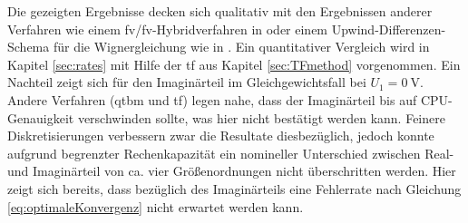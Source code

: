 Die gezeigten Ergebnisse decken sich qualitativ mit den Ergebnissen anderer Verfahren wie einem \ac{fv}/\ac{fv}-Hybridverfahren in \cite{lukas1} oder einem Upwind-Differenzen-Schema für die Wignergleichung wie in \cite{frensley2}. Ein quantitativer Vergleich wird in Kapitel \ref{sec:rates} mit Hilfe der \ac{tf} aus Kapitel \ref{sec:TFmethod} vorgenommen. Ein Nachteil zeigt sich für den Imaginärteil im Gleichgewichtsfall bei $U_1=\SI{0}{\volt}$. Andere Verfahren (\ac{qtbm} und \ac{tf}) legen nahe, dass der Imaginärteil bis auf CPU-Genauigkeit verschwinden sollte, was hier nicht bestätigt werden kann.
Feinere Diskretisierungen verbessern zwar die Resultate diesbezüglich, jedoch konnte aufgrund begrenzter Rechenkapazität ein nomineller Unterschied zwischen Real- und Imaginärteil von ca. vier Größenordnungen nicht überschritten werden. Hier zeigt sich bereits, dass bezüglich des Imaginärteils eine Fehlerrate nach Gleichung \eqref{eq:optimaleKonvergenz} nicht erwartet werden kann.
\clearpage

